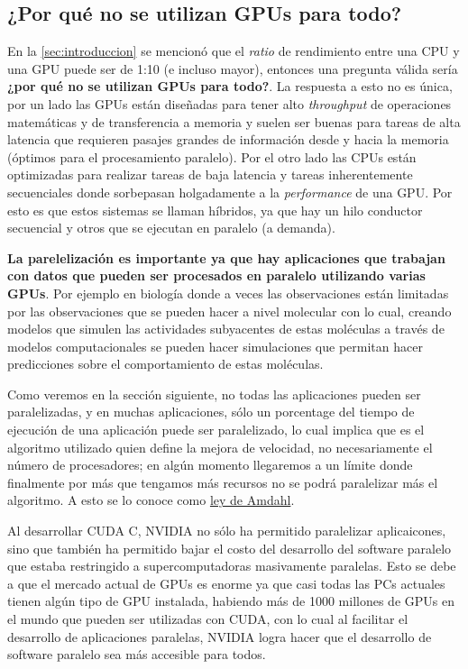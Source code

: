 \subsection*{¿Por qué no se utilizan GPUs para todo?}

En la \ref{sec:introduccion} se mencionó que el \textit{ratio} de rendimiento entre una CPU y una GPU puede ser de 1:10
(e incluso mayor), entonces una pregunta válida sería \textbf{¿por qué no se utilizan GPUs para todo?}. La respuesta a
esto no es única, por un lado las GPUs están diseñadas para tener alto \textit{throughput} de operaciones matemáticas y
de transferencia a memoria y suelen ser buenas para tareas de alta latencia que requieren pasajes grandes de información
desde y hacia la memoria (óptimos para el procesamiento paralelo). Por el otro lado las CPUs están optimizadas para
realizar tareas de baja latencia y tareas inherentemente secuenciales donde sorbepasan holgadamente a la
\textit{performance} de una GPU. Por esto es que estos sistemas se llaman híbridos, ya que hay un hilo conductor
secuencial y otros que se ejecutan en paralelo (a demanda).

\textbf{La parelelización es importante ya que hay aplicaciones que trabajan con datos que pueden ser procesados en
paralelo utilizando varias GPUs}. Por ejemplo en biología donde a veces las observaciones están limitadas por las
observaciones que se pueden hacer a nivel molecular con lo cual, creando modelos que simulen las actividades subyacentes
de estas moléculas a través de modelos computacionales se pueden hacer simulaciones que permitan hacer predicciones
sobre el comportamiento de estas moléculas.

Como veremos en la sección siguiente, no todas las aplicaciones pueden ser paralelizadas, y en muchas aplicaciones, sólo
un porcentage del tiempo de ejecución de una aplicación puede ser paralelizado, lo cual implica que es el algoritmo
utilizado quien define la mejora de velocidad, no necesariamente el número de procesadores; en algún momento llegaremos
a un límite donde finalmente por más que tengamos más recursos no se podrá paralelizar más el algoritmo. A esto se lo
conoce como \href{https://es.wikipedia.org/wiki/Ley_de_Amdahl}{ley de Amdahl}.

Al desarrollar CUDA C, NVIDIA no sólo ha permitido paralelizar aplicaicones, sino que también ha permitido bajar el
costo del desarrollo del software paralelo que estaba restringido a supercomputadoras masivamente paralelas. Esto se
debe a que el mercado actual de GPUs es enorme ya que casi todas las PCs actuales tienen algún tipo de GPU instalada,
habiendo más de 1000 millones de GPUs en el mundo que pueden ser utilizadas con CUDA, con lo cual al facilitar el
desarrollo de aplicaciones paralelas, NVIDIA logra hacer que el desarrollo de software paralelo sea más accesible para
todos.

